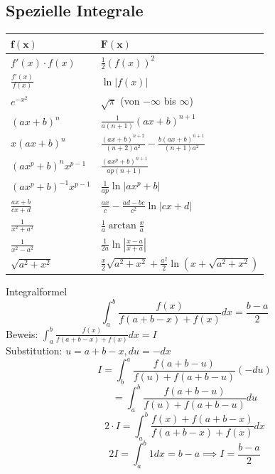 \documentclass[a4paper,fontsize = 7pt]{scrartcl}
\renewcommand*{\arraystretch}{2}
\begin{document}
\subsection{Spezielle Integrale}

\begin{center}
\renewcommand*{\arraystretch}{1.5}
\begin{tabularx}{\linewidth}{>{\centering\arraybackslash}X>{\centering\arraybackslash}X}
\toprule
$\mathbf{f(x)}$ & $\mathbf{F(x)}$ \\
\midrule
$f'(x) \cdot f(x)$ & $\frac{1}{2}(f(x))^2$ \\
$\frac{f'(x)}{f(x)}$ & $\ln|f(x)|$ \\
$e^{-x^2}$ & $\sqrt{\pi}$ (von $-\infty$ bis $\infty$) \\
$(ax+b)^n$ & $\frac{1}{a(n+1)}(ax+b)^{n+1}$ \\
$x(ax+b)^n$ & $\frac{(ax+b)^{n+2}}{(n+2)a^2} - \frac{b(ax+b)^{n+1}}{(n+1)a^2}$ \\
$(ax^p+b)^n x^{p-1}$ & $\frac{(ax^p+b)^{n+1}}{ap(n+1)}$ \\
$(ax^p+b)^{-1} x^{p-1}$ & $\frac{1}{ap}\ln|ax^p+b|$ \\
$\frac{ax+b}{cx+d}$ & $\frac{ax}{c} - \frac{ad-bc}{c^2}\ln|cx+d|$ \\
$\frac{1}{x^2+a^2}$ & $\frac{1}{a}\arctan\frac{x}{a}$ \\
$\frac{1}{x^2-a^2}$ & $\frac{1}{2a}\ln\left|\frac{x-a}{x+a}\right|$ \\
$\sqrt{a^2+x^2}$ & $\frac{x}{2}\sqrt{a^2+x^2} + \frac{a^2}{2}\ln(x+\sqrt{a^2+x^2})$ \\
\bottomrule
\end{tabularx}
\end{center}

\begin{mainbox}{Integralformel}
  \vspace{-12pt}
  $$\int_a^b \frac{f(x)}{f(a+b-x)+f(x)}dx = \frac{b-a}{2}$$
  Beweis:
  $\int_a^b \frac{f(x)}{f(a+b-x)+f(x)}dx = I$
  \\Substitution: $u = a + b -x, du = -dx$
  $$I = \int_b^a \frac{f(a+b-u)}{f(u)+f(a+b-u)}(-du) $$
  $$= \int_a^b \frac{f(a+b-u)}{f(u)+f(a+b-u)}du$$
  $$2 \cdot I = \int_a^b \frac{f(x)+f(a+b-x)}{f(a+b-x)+f(x)}dx$$
  $$2I = \int_a^b1dx = b-a \implies I = \frac{b-a}{2}$$
\end{mainbox}
\end{document}

